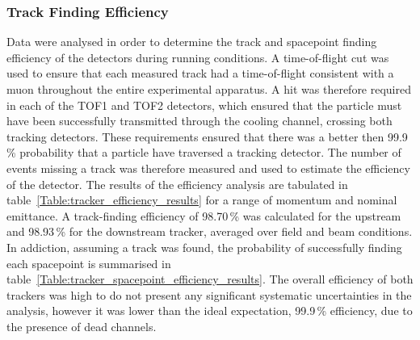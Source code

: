 \subsubsection{Track Finding Efficiency}
\label{trackers:performance:efficiency}
Data were analysed in order to determine the track and spacepoint finding efficiency of the detectors during running conditions. A time-of-flight cut was used to ensure that each measured track had a time-of-flight consistent with a muon throughout the entire experimental apparatus. A hit was therefore required in each of the TOF1 and TOF2 detectors, which ensured that the particle must have been successfully transmitted through the cooling channel, crossing both tracking detectors. These requirements ensured that there was a better then 99.9\,\% probability that a particle have traversed a tracking detector.
The number of events missing a track was therefore measured and used to estimate the efficiency of the detector.
The results of the efficiency analysis are tabulated in table~\ref{Table:tracker_efficiency_results} for a range of momentum and nominal emittance. A track-finding efficiency of 98.70\,\% was calculated for the upstream and 98.93\,\% for the downstream tracker, averaged over field and beam conditions. In addiction, assuming a track was found, the probability of successfully finding each spacepoint is summarised in table~\ref{Table:tracker_spacepoint_efficiency_results}. The overall efficiency of both trackers was high to do not present any significant systematic uncertainties in the analysis, however it was lower than the ideal expectation, 99.9\,\% efficiency, due to the presence of dead channels.

